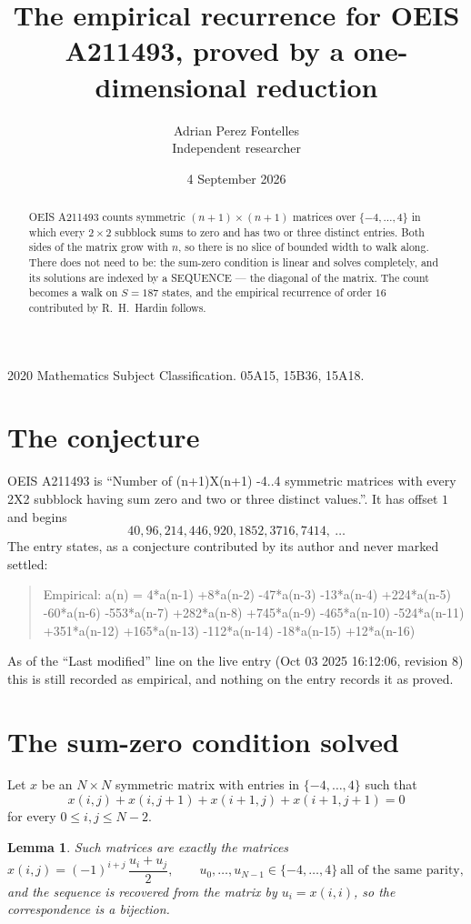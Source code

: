\documentclass[11pt,a4paper]{article}
\title{The empirical recurrence for OEIS A211493, proved by a one-dimensional reduction}
\author{Adrian Perez Fontelles\\ \small Independent researcher}
\date{4 September 2026}
\theoremstyle{plain}
\newtheorem{lemma}[theorem]{Lemma}
\theoremstyle{definition}
\begin{document}
\maketitle

\begin{abstract}
OEIS A211493 counts symmetric $(n+1)\times(n+1)$ matrices over
$\{-4,\dots,4\}$ in which every $2\times2$ subblock sums to zero and has two or three distinct
entries. Both sides of the matrix grow with $n$, so there is no slice of bounded width to walk
along. There does not need to be: the sum-zero condition is linear and solves completely, and
its solutions are indexed by a SEQUENCE --- the diagonal of the matrix. The count becomes a walk
on $S=187$ states, and the empirical recurrence of order $16$ contributed by R.~H.~Hardin
follows.
\end{abstract}

\noindent\small 2020 Mathematics Subject Classification. 05A15, 15B36, 15A18.\normalsize

\section{The conjecture}

OEIS A211493 is ``Number of (n+1)X(n+1) -4..4 symmetric matrices with every 2X2 subblock having sum zero and two or three distinct values.''. It has offset $1$ and begins
\[
40, 96, 214, 446, 920, 1852, 3716, 7414,\ \dots
\]
The entry states, as a conjecture contributed by its author and never marked settled:
\begin{quote}
Empirical: a(n) = 4*a(n-1) +8*a(n-2) -47*a(n-3) -13*a(n-4) +224*a(n-5) -60*a(n-6) -553*a(n-7) +282*a(n-8) +745*a(n-9) -465*a(n-10) -524*a(n-11) +351*a(n-12) +165*a(n-13) -112*a(n-14) -18*a(n-15) +12*a(n-16)
\end{quote}
As of the ``Last modified'' line on the live entry (Oct 03 2025 16:12:06, revision 8) this is still
recorded as empirical, and nothing on the entry records it as proved.

\section{The sum-zero condition solved}

Let $x$ be an $N\times N$ symmetric matrix with entries in $\{-4,\dots,4\}$ such that
\[
x(i,j)+x(i,j{+}1)+x(i{+}1,j)+x(i{+}1,j{+}1)=0
\]
for every $0\le i,j\le N-2$.

\begin{lemma}\label{lem:solve}
Such matrices are exactly the matrices
\[
x(i,j)=(-1)^{i+j}\,\frac{u_i+u_j}{2},
\qquad u_0,\dots,u_{N-1}\in\{-4,\dots,4\}\ \text{all of the same parity},
\]
and the sequence is recovered from the matrix by $u_i=x(i,i)$, so the correspondence is a
bijection.
\end{lemma}
\end{document}

